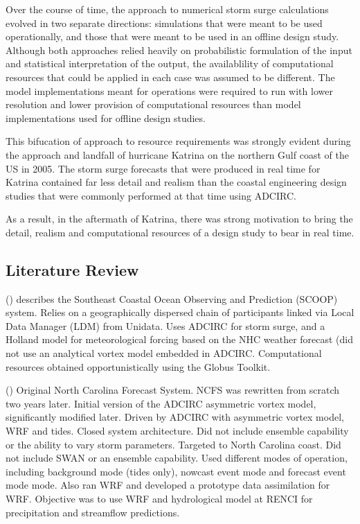 \documentclass[12pt]{article}
\begin{document}
Over the course of time, the approach to numerical storm surge 
calculations evolved in two separate directions: simulations that 
were meant to be used operationally, and those that were meant to be 
used in an offline design study. Although both approaches relied 
heavily on probabilistic formulation of the input and statistical 
interpretation of the output, the availablility of computational 
resources that could be applied in each case was assumed to be 
different. The model implementations meant for operations were 
required to run with lower resolution and lower provision of 
computational resources than model implementations used for offline 
design studies. 

This bifucation of approach to resource requirements was strongly 
evident during the approach and landfall of hurricane Katrina on the 
northern Gulf coast of the US in 2005. The storm surge forecasts 
that were produced in real time for Katrina contained far less 
detail and realism than the coastal engineering design studies that 
were commonly performed at that time using ADCIRC. 

As a result, in the aftermath of Katrina, there was strong 
motivation to bring the detail, realism and computational resources 
of a design study to bear in real time.  

\subsection{Literature Review}

(\cite{RamakrishnanL2006}) describes the Southeast Coastal Ocean 
Observing and Prediction (SCOOP) system. Relies on a geographically 
dispersed chain of participants linked via Local Data Manager (LDM) 
from Unidata. Uses ADCIRC for storm surge, and a Holland model for 
meteorological forcing based on the NHC weather forecast (did not 
use an analytical vortex model embedded in ADCIRC. Computational 
resources obtained opportunistically using the Globus Toolkit. 

(\cite{MattocksC2006}) Original North Carolina Forecast System. NCFS 
was rewritten from scratch two years later. Initial version of the 
ADCIRC asymmetric vortex model, significantly modified later. Driven 
by ADCIRC with asymmetric vortex model, WRF and tides. Closed system 
architecture.  Did not include ensemble capability or the ability to 
vary storm parameters. Targeted to North Carolina coast. Did not 
include SWAN or an ensemble capability. Used different modes of 
operation, including background mode (tides only), nowcast event 
mode and forecast event mode mode. Also ran WRF and developed a 
prototype data assimilation for WRF. Objective was to use WRF and 
hydrological model at RENCI for precipitation and streamflow 
predictions.
\end{document}
